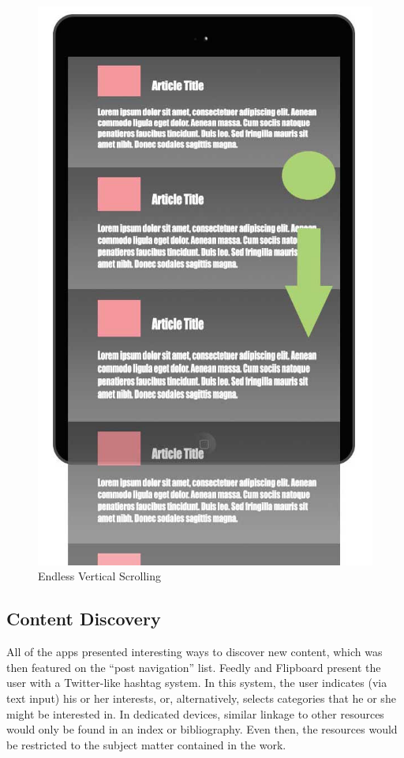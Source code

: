 \documentclass[11pt, oneside]{article}   	%
\begin{document}
\begin{figure}[!hb]
    \centering
    \includegraphics[scale=0.3]{Endless-List.jpg}
    \caption{Endless Vertical Scrolling}
    \label{fig:endless-scroll}
\end{figure}


\subsection{Content Discovery}
All of the apps presented interesting ways to discover new content, which was then featured on the ``post navigation'' list. Feedly and Flipboard present the user with a Twitter-like hashtag system. In this system, the user indicates (via text input) his or her interests, or, alternatively, selects categories that he or she might be interested in. In dedicated devices, similar linkage to other resources would only be found in an index or bibliography. Even then, the resources would be restricted to the subject matter contained in the work.
\end{document}
